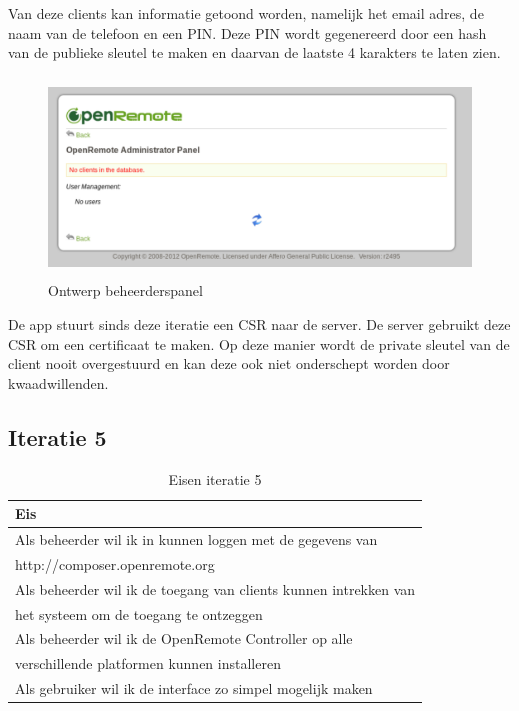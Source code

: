 \documentclass[]{article}
\begin{document}
Van deze clients kan informatie getoond worden, namelijk het email adres,
de naam van de telefoon en een PIN. Deze PIN wordt gegenereerd door een
hash van de publieke sleutel te maken en daarvan de laatste 4 karakters te
laten zien.

\begin{figure}[h!]
  \centering
    \includegraphics[height=150pt,keepaspectratio]{adminv1.pdf}
  \caption{Ontwerp beheerderspanel}
  \label{fig:adminv1}
\end{figure}

De app stuurt sinds deze iteratie een CSR naar de server. De server
gebruikt deze CSR om een certificaat te maken. Op deze manier wordt de private
sleutel van de client nooit overgestuurd en kan deze ook niet onderschept
worden door kwaadwillenden.

\subsection{Iteratie 5}
\begin{table}[htpb]
  \caption{Eisen iteratie 5}
  \begin{center}
    \begin{tabular}{|| l ||}\hline
        Eis                                                              \\\hline\hline
        Als beheerder wil ik in kunnen loggen met de gegevens van        \\
        http://composer.openremote.org                                   \\\hline
        Als beheerder wil ik de toegang van clients kunnen intrekken van \\ 
        het systeem om de toegang te ontzeggen                           \\\hline
        Als beheerder wil ik de OpenRemote Controller op alle            \\ 
        verschillende platformen kunnen installeren                      \\\hline
        Als gebruiker wil ik de interface zo simpel mogelijk maken       \\\hline
    \end{tabular}
  \end{center}
\end{table}
\end{document}
